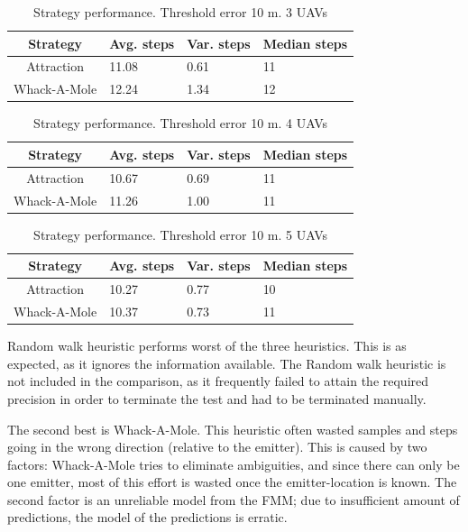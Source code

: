 \documentclass[10pt,a4paper]{book}
\begin{document}
\begin{table}[H]
\centering
\caption{Strategy performance. Threshold error 10 m. 3 \glspl{UAV}}
\begin{tabular}{c|l|l|l}
\textbf{Strategy} & \textbf{Avg. steps}  & \textbf{Var. steps} & \textbf{Median steps}\\ \hline
Attraction & 11.08 &  0.61  &  11 \\ 
Whack-A-Mole  & 12.24 &  1.34  &  12\\ 

\end{tabular}
\end{table}


\begin{table}[H]
\centering
\caption{Strategy performance. Threshold error 10 m. 4 \glspl{UAV}}
\begin{tabular}{c|l|l|l}
\textbf{Strategy} & \textbf{Avg. steps}  & \textbf{Var. steps} & \textbf{Median steps}\\ \hline
Attraction & 10.67 &  0.69  &  11 \\ 
Whack-A-Mole & 11.26 & 1.00 &  11 \\ 

\end{tabular}
\end{table}


\begin{table}[H]
\centering
\caption{Strategy performance. Threshold error 10 m. 5 \glspl{UAV}}
\begin{tabular}{c|l|l|l}
\textbf{Strategy} & \textbf{Avg. steps}  & \textbf{Var. steps} & \textbf{Median steps}\\ \hline
Attraction & 10.27 &  0.77  &  10 \\ 
Whack-A-Mole & 10.37 & 0.73 &  11 \\ 

\end{tabular}
\end{table}

Random walk heuristic performs worst of the three heuristics. This is as expected, as it ignores the information available. The Random walk heuristic is not included in the comparison, as it frequently failed to attain the required precision in order to terminate the test and had to be terminated manually. 

The second best is Whack-A-Mole. This heuristic often wasted samples and steps going in the wrong direction (relative to the emitter). This is caused by two factors: Whack-A-Mole tries to eliminate ambiguities, and since there can only be one emitter, most of this effort is wasted once the emitter-location is known. The second factor is an unreliable model from the \gls{FMM}; due to insufficient amount of predictions, the model of the predictions is erratic. 
\end{document}
